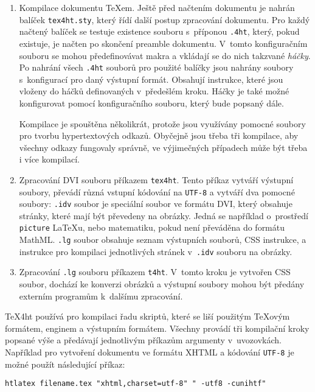 \documentclass{csbulletin}
\begin{document}
\begin{enumerate}
  \item Kompilace dokumentu \TeX em. Ještě před načtením dokumentu je nahrán
    balíček \texttt{tex4ht.sty}, který řídí další postup zpracování dokumentu.
    Pro každý načtený balíček se testuje existence souboru s~příponou
    \texttt{.4ht}, který, pokud existuje, je načten po skončení preamble
    dokumentu. V~tomto konfiguračním souboru se mohou předefinovávat makra a
    vkládají se do nich takzvané \textit{háčky}. Po nahrání všech \texttt{.4ht}
    souborů pro použité balíčky jsou nahrány soubory s~konfigurací pro daný
    výstupní formát. Obsahují instrukce, které jsou vloženy do háčků
    definovaných v~předešlém kroku. Háčky je také možné konfigurovat pomocí
    konfiguračního souboru, který bude popsaný dále. 

    Kompilace je spouštěna několikrát, protože jsou využívány pomocné soubory
    pro tvorbu hypertextových odkazů. Obyčejně jsou třeba tři kompilace, aby
    všechny odkazy fungovaly správně, ve výjimečných případech může být třeba i
    více kompilací. 

  \item Zpracování DVI souboru příkazem \texttt{tex4ht}. Tento příkaz vytváří
    výstupní soubory, převádí různá vstupní kódování na \texttt{UTF-8} a
    vytváří dva pomocné soubory: \texttt{.idv} soubor je speciální soubor ve
    formátu DVI, který obsahuje stránky, které mají být převedeny na obrázky.
    Jedná se například o~prostředí \texttt{picture} LaTeXu, nebo matematiku,
    pokud není převáděna do formátu MathML. \texttt{.lg} soubor obsahuje seznam
    výstupních souborů, CSS instrukce, a instrukce pro kompilaci jednotlivých
    stránek v~\texttt{.idv} souboru na obrázky.
  \item Zpracování \texttt{.lg} souboru příkazem \texttt{t4ht}. V~tomto kroku
    je vytvořen CSS soubor, dochází ke konverzi obrázků a výstupní soubory
    mohou být předány externím programům k~dalšímu zpracování.
\end{enumerate} 

TeX4ht používá pro kompilaci řadu skriptů, které se liší použitým \TeX ovým
formátem, enginem a výstupním formátem. Všechny provádí tři kompilační kroky
popsané výše a předávají jednotlivým příkazům argumenty v~uvozovkách.
Například pro vytvoření dokumentu ve formátu XHTML a kódování \texttt{UTF-8} je
možné použít následující příkaz: 
  
\begin{verbatim}
htlatex filename.tex "xhtml,charset=utf-8" " -utf8 -cunihtf"
\end{verbatim}
\end{document}
